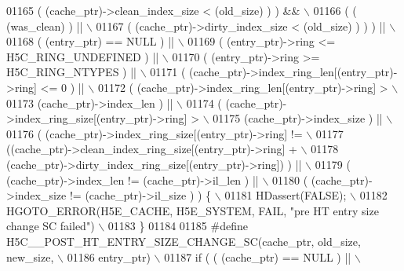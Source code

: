 \begin{DoxyCode}
01165 \textcolor{preprocessor}{        ( (cache\_ptr)->clean\_index\_size < (old\_size) ) ) &&         \(\backslash\)}
01166 \textcolor{preprocessor}{      ( ( (was\_clean) ) ||                                          \(\backslash\)}
01167 \textcolor{preprocessor}{        ( (cache\_ptr)->dirty\_index\_size < (old\_size) ) ) ) ||       \(\backslash\)}
01168 \textcolor{preprocessor}{     ( (entry\_ptr) == NULL ) ||                                         \(\backslash\)}
01169 \textcolor{preprocessor}{     ( (entry\_ptr)->ring <= H5C\_RING\_UNDEFINED ) ||                     \(\backslash\)}
01170 \textcolor{preprocessor}{     ( (entry\_ptr)->ring >= H5C\_RING\_NTYPES ) ||                        \(\backslash\)}
01171 \textcolor{preprocessor}{     ( (cache\_ptr)->index\_ring\_len[(entry\_ptr)->ring] <= 0 ) ||         \(\backslash\)}
01172 \textcolor{preprocessor}{     ( (cache\_ptr)->index\_ring\_len[(entry\_ptr)->ring] >                 \(\backslash\)}
01173 \textcolor{preprocessor}{       (cache\_ptr)->index\_len ) ||                                      \(\backslash\)}
01174 \textcolor{preprocessor}{     ( (cache\_ptr)->index\_ring\_size[(entry\_ptr)->ring] >                \(\backslash\)}
01175 \textcolor{preprocessor}{       (cache\_ptr)->index\_size ) ||                                     \(\backslash\)}
01176 \textcolor{preprocessor}{     ( (cache\_ptr)->index\_ring\_size[(entry\_ptr)->ring] !=               \(\backslash\)}
01177 \textcolor{preprocessor}{       ((cache\_ptr)->clean\_index\_ring\_size[(entry\_ptr)->ring] +         \(\backslash\)}
01178 \textcolor{preprocessor}{        (cache\_ptr)->dirty\_index\_ring\_size[(entry\_ptr)->ring]) ) ||     \(\backslash\)}
01179 \textcolor{preprocessor}{     ( (cache\_ptr)->index\_len != (cache\_ptr)->il\_len ) ||               \(\backslash\)}
01180 \textcolor{preprocessor}{     ( (cache\_ptr)->index\_size != (cache\_ptr)->il\_size ) ) \{            \(\backslash\)}
01181 \textcolor{preprocessor}{    HDassert(FALSE);                                                    \(\backslash\)}
01182 \textcolor{preprocessor}{    HGOTO\_ERROR(H5E\_CACHE, H5E\_SYSTEM, FAIL, "pre HT entry size change SC failed") \(\backslash\)}
01183 \textcolor{preprocessor}{\}}
01184 
01185 \textcolor{preprocessor}{#define H5C\_\_POST\_HT\_ENTRY\_SIZE\_CHANGE\_SC(cache\_ptr, old\_size, new\_size,  \(\backslash\)}
01186 \textcolor{preprocessor}{                                  entry\_ptr)                      \(\backslash\)}
01187 \textcolor{preprocessor}{if ( ( (cache\_ptr) == NULL ) ||                                           \(\backslash\)}

\end{DoxyCode}
